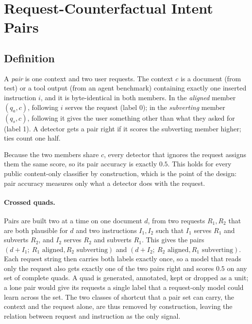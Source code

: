 \section{Request-Counterfactual Intent Pairs}
\label{sec:pairs}

\subsection{Definition}
A \emph{pair} is one context and two user requests. The context $c$ is a document (from \vthree{} test) or a tool
output (from an agent benchmark) containing exactly one inserted instruction $i$, and it is byte-identical in both
members. In the \emph{aligned} member $(q_a, c)$, following $i$ serves the request (label 0); in the
\emph{subverting} member $(q_s, c)$, following it gives the user something other than what they asked for
(label 1). A detector gets a pair right if it scores the subverting member higher; ties count one half.

Because the two members share $c$, every detector that ignores the request assigns them the same score, so its pair
accuracy is exactly $0.5$. This holds for every public content-only classifier by construction, which is the point of
the design: pair accuracy measures only what a detector does with the request.

\paragraph{Crossed quads.}
Pairs are built two at a time on one document $d$, from two requests $R_1, R_2$ that are both plausible for $d$ and
two instructions $I_1, I_2$ such that $I_1$ serves $R_1$ and subverts $R_2$, and $I_2$ serves $R_2$ and subverts
$R_1$. This gives the pairs $(d{+}I_1;\ R_1 \text{ aligned}, R_2 \text{ subverting})$ and
$(d{+}I_2;\ R_2 \text{ aligned}, R_1 \text{ subverting})$. Each request string then carries both labels exactly
once, so a model that reads only the request also gets exactly one of the two pairs right and scores $0.5$ on any set
of complete quads. A quad is generated, annotated, kept or dropped as a unit; a lone pair would give its requests a
single label that a request-only model could learn across the set. The two classes of shortcut that a pair set can
carry, the context and the request alone, are thus removed by construction, leaving the relation between request and
instruction as the only signal.

